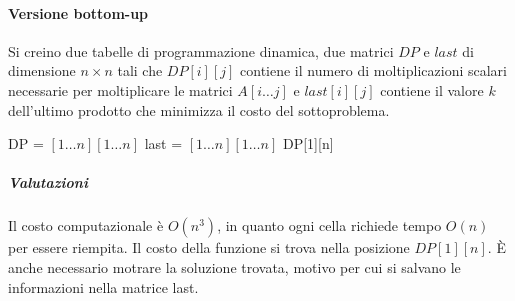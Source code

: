 \paragraph{Versione bottom-up}
Si creino due tabelle di programmazione dinamica, due matrici $DP$ e $last$ di dimensione $n\times n$ tali che $DP[i][j]$ contiene il numero di moltiplicazioni scalari necessarie per 
moltiplicare le matrici $A[i\dots j]$ e $last[i][j]$ contiene il valore $k$ dell'ultimo prodotto che minimizza il costo del sottoproblema.
\begin{algorithm}[H]
\DontPrintSemicolon
{}





\SetKwFunction{}{}
\SetKwFunction{}{}
\SetKwFunction{}{}
\SetKwFunction{}{}
\SetKwFunction{}{}

\caption{\protect\Int \protect{}}
\Int[][] DP = \New \Int$[1\dots n][1\dots n]$\;
\Int[][] last = \New \Int$[1\dots n][1\dots n]$\;
\Return DP[1][n]
\end{algorithm}
\subparagraph{Valutazioni}
Il costo computazionale \`e $O(n^3)$, in quanto ogni cella richiede tempo $O(n)$ per essere riempita. Il costo della funzione si trova nella posizione $DP[1][n]$. \`E anche necessario
motrare la soluzione trovata, motivo per cui si salvano le informazioni nella matrice last. 
